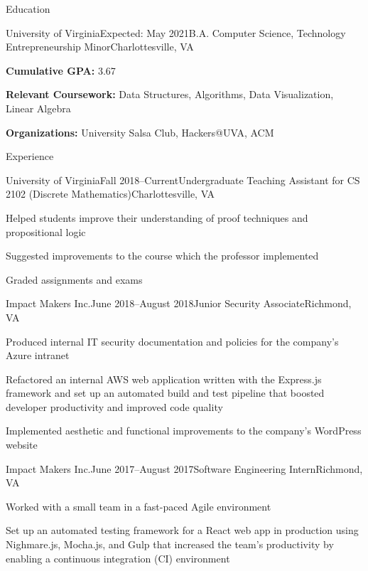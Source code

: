 \documentclass{resume}
\begin{document}
\begin{rSection}{Education}
  \begin{rSubsection}{University of Virginia}{Expected: May 2021}{B.A. Computer Science, Technology Entrepreneurship Minor}{Charlottesville, VA}
  \item \textbf{Cumulative GPA:} 3.67
  \item \textbf{Relevant Coursework:} Data Structures, Algorithms, Data Visualization, Linear Algebra
  \item \textbf{Organizations:} University Salsa Club, Hackers@UVA, ACM
  \end{rSubsection}
\end{rSection}

\begin{rSection}{Experience}

  \begin{rSubsection}{University of Virginia}{Fall 2018--Current}{Undergraduate Teaching Assistant for CS 2102 (Discrete Mathematics)}{Charlottesville, VA}
  \item Helped students improve their understanding of proof techniques and propositional logic
  \item Suggested improvements to the course which the professor implemented
  \item Graded assignments and exams
  \end{rSubsection}

  \begin{rSubsection}{Impact Makers Inc.}{June 2018--August 2018}{Junior Security Associate}{Richmond, VA}
  \item Produced internal IT security documentation and policies for the company's Azure intranet
  \item Refactored an internal AWS web application written with the Express.js framework and set up an automated build and test pipeline that boosted developer productivity and improved code quality
  \item Implemented aesthetic and functional improvements to the company's WordPress website
  \end{rSubsection}

  \begin{rSubsection}{Impact Makers Inc.}{June 2017--August 2017}{Software Engineering Intern}{Richmond, VA}
  \item Worked with a small team in a fast-paced Agile environment
  \item Set up an automated testing framework for a React web app in production using Nighmare.js, Mocha.js, and Gulp that increased the team's productivity by enabling a continuous integration (CI) environment
  \end{rSubsection}

\end{rSection}
\end{document}
